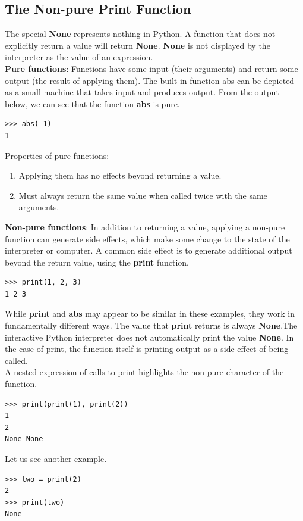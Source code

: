 \documentclass[11pt]{article}
\begin{document}
\subsection{The Non-pure Print Function} 
The special \textbf{None} represents nothing in Python. A function that does not explicitly return a value will return \textbf{None}. \textbf{None} is not displayed by the interpreter as the value of an expression. \\
\newline
\textbf{Pure functions}: Functions have some input (their arguments) and return some output (the result of applying them). The built-in function abs can be depicted as a small machine that takes input and produces output. From the output below, we can see that the function \textbf{abs} is pure.
\begin{lstlisting}
>>> abs(-1)
1 
\end{lstlisting} 
Properties of pure functions: 
\begin{enumerate}
\item Applying them has no effects beyond returning a value. 
\item Must always return the same value when called twice with the same arguments.
\end{enumerate}
\textbf{Non-pure functions}: In addition to returning a value, applying a non-pure function can generate side effects, which make some change to the state of the interpreter or computer. A common side effect is to generate additional output beyond the return value, using the \textbf{print} function. 
\begin{lstlisting}
>>> print(1, 2, 3)
1 2 3
\end{lstlisting}
While \textbf{print} and \textbf{abs} may appear to be similar in these examples, they work in fundamentally different ways. The value that \textbf{print} returns is always \textbf{None}.The interactive Python interpreter does not automatically print the value \textbf{None}. In the case of print, the function itself is printing output as a side effect of being called. \\
A nested expression of calls to print highlights the non-pure character of the function. 
\begin{lstlisting}
>>> print(print(1), print(2))
1
2 
None None
\end{lstlisting}
Let us see another example. 
\begin{lstlisting}
>>> two = print(2)
2
>>> print(two)
None 
\end{lstlisting} 
\end{document}
